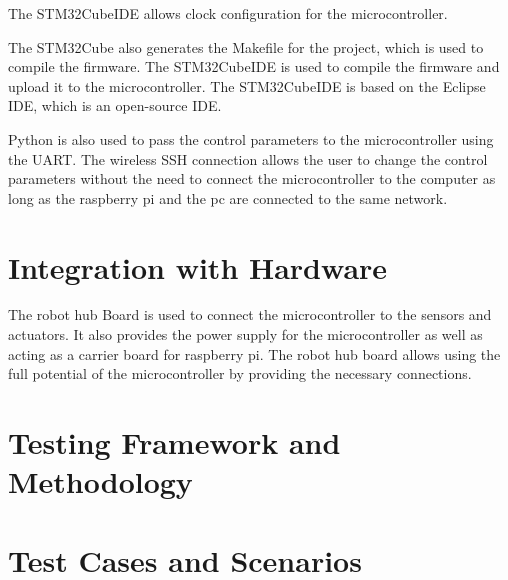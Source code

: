 The STM32CubeIDE allows clock configuration for the microcontroller.


The STM32Cube also generates the Makefile for the project, which is used to compile the firmware.
The STM32CubeIDE is used to compile the firmware and upload it to the microcontroller.
The STM32CubeIDE is based on the Eclipse IDE, which is an open-source IDE.


Python is also used to pass the control parameters to the microcontroller using the UART. The wireless SSH connection allows the user to change the control parameters without the need to connect the microcontroller to the computer as long as the raspberry pi and the pc are connected to the same network.

\section{Integration with Hardware}
The robot hub Board is used to connect the microcontroller to the sensors and actuators. It also provides the power supply for the microcontroller as well as acting as a carrier board for raspberry pi.
The robot hub board allows using the full potential of the microcontroller by providing the necessary connections.
\section{Testing Framework and Methodology}
\section{Test Cases and Scenarios}
\newpage
